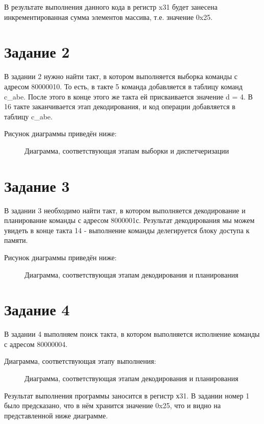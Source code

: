 В результате выполнения данного кода в регистр x31 будет занесена инкрементированная сумма элементов массива, т.е. значение 0x25.

\section{Задание 2}
В задании 2 нужно найти такт, в котором выполняется выборка команды с адресом 80000010. То есть, в такте 5 команда добавляется в таблицу команд c\_abe. После этого в конце этого же такта ей присваивается значение d = 4. В 16 такте заканчивается этап декодирования, и код операции добавляется в таблицу c\_abe.

Рисунок диаграммы приведён ниже:
\begin{figure}[ph!]
	\caption{Диаграмма, соответствующая этапам выборки и диспетчеризации}
\end{figure}

\section{Задание 3}
В задании 3 необходимо найти такт, в котором выполняется декодирование и планирование команды с адресом 8000001с. Результат декодирования мы можем увидеть в конце такта 14 - выполнение команды делегируется блоку доступа к памяти.

Рисунок диаграммы приведён ниже:
\begin{figure}[ph!]
	\caption{Диаграмма, соответствующая этапам декодирования и планирования}
\end{figure}

\section{Задание 4}
В задании 4 выполняем поиск такта, в котором выполняется исполнение команды с адресом 80000004. 

Диаграмма, соответствующая этапу выполнения:

\begin{figure}[ph!]
	\caption{Диаграмма, соответствующая этапам декодирования и планирования}
\end{figure}

\newpage

Результат выполнения программы заносится в регистр х31. В задании номер 1 было предсказано, что в нём хранится значение 0x25, что и видно на представленной ниже диаграмме.

